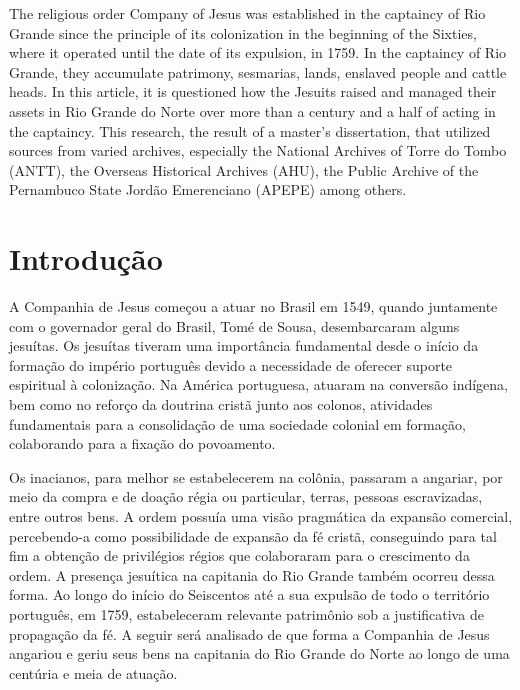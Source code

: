 \begin{refsection}
\begin{otherlanguage}{english}
\begin{galoResumo}[Abstract]
    The religious order Company of Jesus was established in the captaincy of Rio Grande since the principle of its colonization in the beginning of the Sixties, where it operated until the date of its expulsion, in 1759. In the captaincy of Rio Grande, they accumulate patrimony, sesmarias, lands, enslaved people and cattle heads. In this article, it is questioned how the Jesuits raised and managed their assets in Rio Grande do Norte over more than a century and a half of acting in the captaincy. This research, the result of a master's dissertation, that utilized sources from varied archives, especially the National Archives of Torre do Tombo (ANTT), the Overseas Historical Archives (AHU), the Public Archive of the Pernambuco State Jordão Emerenciano (APEPE) among others.
\end{galoResumo}

\end{otherlanguage}


\section{Introdução}
A Companhia de Jesus começou a atuar no Brasil em 1549, quando juntamente com o governador geral do Brasil, Tomé de Sousa, desembarcaram alguns jesuítas. Os jesuítas tiveram uma importância fundamental desde o início da formação do império português devido a necessidade de oferecer suporte espiritual à colonização. Na América portuguesa, atuaram na conversão indígena, bem como no reforço da doutrina cristã junto aos colonos, atividades fundamentais para a consolidação de uma sociedade colonial em formação, colaborando para a fixação do povoamento.  

Os inacianos, para melhor se estabelecerem na colônia, passaram a angariar, por meio da compra e de doação régia ou particular, terras, pessoas escravizadas, entre outros bens. A ordem possuía uma visão pragmática da expansão comercial, percebendo-a como possibilidade de expansão da fé cristã, conseguindo para tal fim a obtenção de privilégios régios que colaboraram para o crescimento da ordem. A presença jesuítica na capitania do Rio Grande também ocorreu dessa forma. Ao longo do início do Seiscentos até a sua expulsão de todo o território português, em 1759, estabeleceram relevante patrimônio sob a justificativa de propagação da fé. A seguir será analisado de que forma a Companhia de Jesus angariou e geriu seus bens na capitania do Rio Grande do Norte ao longo de uma centúria e meia de atuação.  






\end{refsection}
